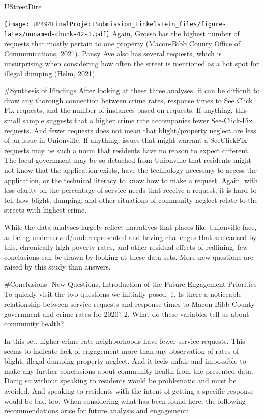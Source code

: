 \documentclass[
]{article}
\newenvironment{Shaded}{\begin{snugshade}}{\end{snugshade}}
\newcommand{\NormalTok}[1]{#1}
\begin{document}
\begin{Shaded}
\begin{Highlighting}[]
\NormalTok{UStreetDire}
\end{Highlighting}
\end{Shaded}

\texttt{[image: UP494FinalProjectSubmission\_Finkelstein\_files/figure-latex/unnamed-chunk-42-1.pdf]}
Again, Grosso has the highest number of requests that mostly pertain to
one property (Macon-Bibb County Office of Communications, 2021). Pansy
Ave also has several requests, which is unsurprising when considering
how often the street is mentioned as a hot spot for illegal dumping
(Helm, 2021).

\#Synthesis of Findings After looking at these three analyses, it can be
difficult to draw any thorough connection between crime rates, response
times to See Click Fix requests, and the number of instances based on
requests. If anything, this small sample suggests that a higher crime
rate accompanies fewer See-Click-Fix requests. And fewer requests does
not mean that blight/property neglect are less of an issue in
Unionville. If anything, issues that might warrant a SeeClickFix
requests may be such a norm that residents have no reason to expect
different. The local government may be so detached from Unionville that
residents might not know that the application exists, have the
technology necessary to access the application, or the technical
literacy to know how to make a request. Again, with less clarity on the
percentage of service needs that receive a request, it is hard to tell
how blight, dumping, and other situations of community neglect relate to
the streets with highest crime.

While the data analyses largely reflect narratives that places like
Unionville face, as being underserved/underrepresented and having
challenges that are caused by this, chronically high poverty rates, and
other residual effects of redlining, few conclusions can be drawn by
looking at these data sets. More new questions are raised by this study
than answers.

\#Conclusions- New Questions, Introduction of the Future Engagement
Priorities To quickly visit the two questions we initially posed: 1. Is
there a noticeable relationship between service requests and response
times to Macon-Bibb County government and crime rates for 2020? 2. What
do these variables tell us about community health?

In this set, higher crime rate neighborhoods have fewer service
requests. This seems to indicate lack of engagement more than any
observation of rates of blight, illegal dumping property neglect. And it
feels unfair and impossible to make any further conclusions about
community health from the presented data. Doing so without speaking to
residents would be problematic and must be avoided. And speaking to
residents with the intent of getting a specific response would be bad
too. When considering what has been found here, the following
recommendations arise for future analysis and engagement:
\end{document}

